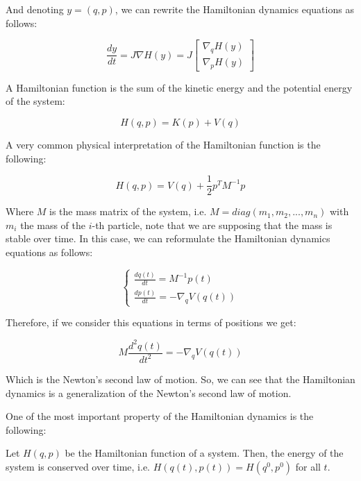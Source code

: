 \documentclass{article}
\begin{document}
And denoting \(y = (q,p)\), we can rewrite the Hamiltonian dynamics equations as follows:

\begin{equation} 
	\frac{dy}{dt} = J \nabla H(y) = J \begin{bmatrix} \nabla_q H(y) \\ \nabla_p H(y) \end{bmatrix}
	\label{eq:hamiltoniandynamics2} 
\end{equation}

A Hamiltonian function is the sum of the kinetic energy and the potential energy of the system:

\begin{equation*}
	H(q,p) = K(p) + V(q)
\end{equation*}

A very common physical interpretation of the Hamiltonian function is the following:

\begin{equation*}
	H(q,p) = V(q) + \frac{1}{2} p^T M^{-1} p
\end{equation*}

Where \(M\) is the mass matrix of the system, i.e. \(M = diag(m_1, m_2, ..., m_n)\) with \(m_i\) the mass of the \(i\)-th particle, note that we are supposing that the mass is stable over time. In this case, we can reformulate the Hamiltonian dynamics equations as follows:

\begin{equation} 
	\begin{cases}
		\frac{dq(t)}{dt} = M^{-1} p(t) \\
		\frac{dp(t)}{dt} = -\nabla_q V(q(t))
	\end{cases}
	\label{eq:hamiltoniandynamics3}
\end{equation}

Therefore, if we consider this equations in terms of positions we get:

\begin{equation*} 
	M\frac{d^2q(t)}{dt^2} = -\nabla_q V(q(t))
\end{equation*}

Which is the Newton's second law of motion. So, we can see that the Hamiltonian dynamics is a generalization of the Newton's second law of motion.

One of the most important property of the Hamiltonian dynamics is the following:

\begin{theorem}
	Let \(H(q,p)\) be the Hamiltonian function of a system. Then, the energy of the system is conserved over time, i.e. \(H(q(t),p(t)) = H(q^0,p^0)\) for all \(t\).
\end{theorem}
\end{document}
